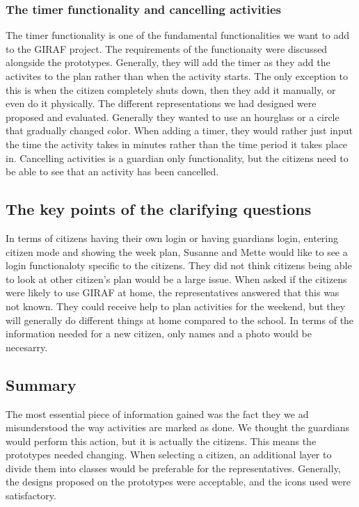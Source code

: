 \subsubsection{The timer functionality and cancelling activities}
The timer functionality is one of the fundamental functionalities we want to add to the GIRAF project.
The requirements of the functionaity were discussed alongside the prototypes.
Generally, they will add the timer as they add the activites to the plan rather than when the activity starts. 
The only exception to this is when the citizen completely shuts down, then they add it manually, or even do it physically.
The different representations we had designed were proposed and evaluated.
Generally they wanted to use an hourglass or a circle that gradually changed color.
When adding a timer, they would rather just input the time the activity takes in minutes rather than the time period it takes place in.
Cancelling activities is a guardian only functionality, but the citizens need to be able to see that an activity has been cancelled. 

\subsection{The key points of the clarifying questions}
In terms of citizens having their own login or having guardians login, entering citizen mode and showing the week plan, Susanne and Mette would like to see a login functionaloty specific to the citizens.
They did not think citizens being able to look at other citizen's plan would be a large issue.
When asked if the citizens were likely to use GIRAF at home, the representatives answered that this was not known.
They could receive help to plan activities for the weekend, but they will generally do different things at home compared to the school. 
In terms of the information needed for a new citizen, only names and a photo would be necesarry. 

\subsection{Summary}
The most essential piece of information gained was the fact they we ad misunderstood the way activities are marked as done. 
We thought the guardians would perform this action, but it is actually the citizens. 
This means the prototypes needed changing.
When selecting a citizen, an additional layer to divide them into classes would be preferable for the representatives.
Generally, the designs proposed on the prototypes were acceptable, and the icons used were satisfactory.